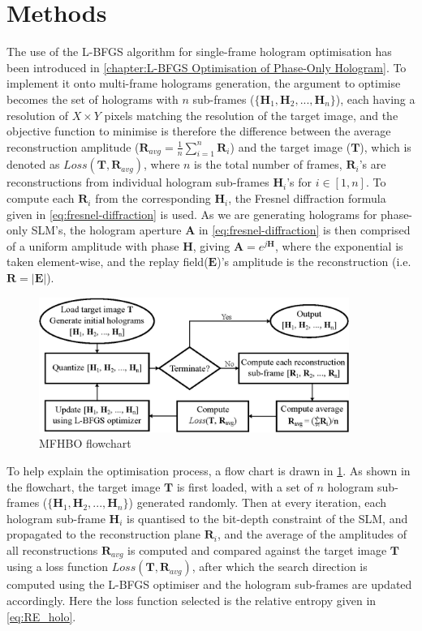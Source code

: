 \section{Methods}
	The use of the L-BFGS algorithm for single-frame hologram optimisation has been introduced in \cref{chapter:L-BFGS Optimisation of Phase-Only Hologram}. To implement it onto multi-frame holograms generation, the argument to optimise becomes the set of holograms with $n$ sub-frames ($\{\textbf{H}_1, \textbf{H}_2, ..., \textbf{H}_n\}$), each having a resolution of $X\times Y$ pixels matching the resolution of the target image, and the objective function to minimise is therefore the difference between the average reconstruction amplitude ($\textbf{R}_{avg}=\frac{1}{n}\sum_{i=1}^n\textbf{R}_i$) and the target image ($\textbf{T}$), which is denoted as $Loss(\textbf{T}, \textbf{R}_{avg})$, where $n$ is the total number of frames, $\textbf{R}_i$'s are reconstructions from individual hologram sub-frames $\textbf{H}_i$'s for $i\in[1,n]$. To compute each $\textbf{R}_i$ from the corresponding $\textbf{H}_i$, the Fresnel diffraction formula given in \cref{eq:fresnel-diffraction} is used. As we are generating holograms for phase-only SLM's, the hologram aperture $\textbf{A}$ in \cref{eq:fresnel-diffraction} is then comprised of a uniform amplitude with phase $\textbf{H}$, giving $\textbf{A} = e^{j\textbf{H}}$, where the exponential is taken element-wise, and the replay field($\textbf{E}$)'s amplitude is the reconstruction (i.e.$\textbf{R} = |\textbf{E}|$).

	\begin{figure}[H]
		\centering
		\includegraphics[width=0.9\textwidth]{MFHO_flowchart.eps}
		\caption{MFHBO flowchart}
		\label{fig:MFHO_flowchart}
	\end{figure}

	To help explain the optimisation process, a flow chart is drawn in \cref{fig:MFHO_flowchart}. As shown in the flowchart, the target image $\textbf{T}$ is first loaded, with a set of $n$ hologram sub-frames ($\{\textbf{H}_1, \textbf{H}_2, ..., \textbf{H}_n\}$) generated randomly. Then at every iteration, each hologram sub-frame $\textbf{H}_i$ is quantised to the bit-depth constraint of the SLM, and propagated to the reconstruction plane $\textbf{R}_i$, and the average of the amplitudes of all reconstructions $\textbf{R}_{avg}$ is computed and compared against the target image $\textbf{T}$ using a loss function $Loss(\textbf{T}, \textbf{R}_{avg})$, after which the search direction is computed using the L-BFGS optimiser and the hologram sub-frames are updated accordingly. Here the loss function selected is the relative entropy\cite{Kullback1951} given in \cref{eq:RE_holo}.

